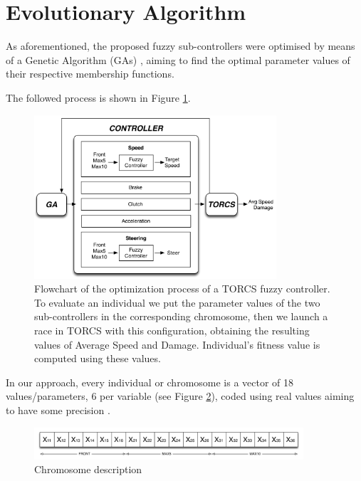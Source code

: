 \documentclass[10pt,journal,compsoc]{IEEEtran}
\begin{document}

\section{Evolutionary Algorithm}
\label{sec:GA_optimization}


As aforementioned, the proposed fuzzy sub-controllers were optimised by means of a Genetic Algorithm (GAs) \cite{GAs_Goldberg89}, aiming to find the optimal parameter values of their respective membership functions.

The followed process is shown in Figure \ref{fig:ga}. 

 \begin{figure}[!ht]
 	\label{fig:ga}
 	\begin{center}
 		\includegraphics[width=9cm]{fig/flowchart}
 	\end{center}
 	\caption{Flowchart of the optimization process of a TORCS fuzzy controller. To evaluate an individual we put the parameter values of the two sub-controllers in the corresponding chromosome, then we launch a race in TORCS with this configuration, obtaining the resulting values of Average Speed and Damage. Individual's fitness value is computed using these values.}
 \end{figure}

In our approach, every individual or chromosome is a vector of 18 values/parameters, 6 per variable (see Figure \ref {fig:cromosome}), coded using real values aiming to have some precision \cite{elsayed13}.

 \begin{figure}[!ht]	
 	\begin{center}
 		\includegraphics[width=10cm]{fig/chromosome2.png}
 		\caption{Chromosome description}
 		\label{fig:cromosome}	
 	\end{center}	
 \end{figure}
\end{document}
